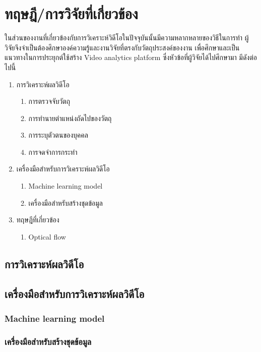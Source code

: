 \clearpage
\chapter{ทฤษฎี/การวิจัยที่เกี่ยวข้อง}
ในส่วนของงานที่เกี่ยวข้องกับการวิเคราะห์วิดีโอในปัจจุบันนั้นมีความหลากหลายของวิธีในการทำ ผู้วิจัยจึงจำเป็นต้องศึกษาองค์ความรู้และงานวิจัยที่ตรงกับวัตถุประสงค์ของงาน เพื่อศึกษาและเป็นแนวทางในการประยุกต์ใช้สร้าง Video analytics platform ซึ่งหัวข้อที่ผู้วิจัยได้ไปศึกษามา มีดังต่อไปนี้
\begin{enumerate}
	\setlength\itemsep{-0.25em}
	\item การวิเคราะห์ผลวิดีโอ
	\begin{enumerate}	
		\item การตรวจจับวัตถุ
		\item การทำนายตำแหน่งถัดไปของวัตถุ
		\item การระบุตัวตนของบุคคล
		\item การจดจำการกระทำ
	\end{enumerate}
	\setlength\itemsep{-0.25em}
	\item เครื่องมือสำหรับการวิเคราะห์ผลวิดีโอ
	\begin{enumerate}	
		\item Machine learning model
		\item เครื่องมือสำหรับสร้างชุดข้อมูล
	\end{enumerate}
	\item ทฤษฎีที่เกี่ยวข้อง
	\begin{enumerate}	
		\item Optical flow
	\end{enumerate}
\end{enumerate}

\section{การวิเคราะห์ผลวิดีโอ}


\clearpage
\section{เครื่องมือสำหรับการวิเคราะห์ผลวิดีโอ}
\subsection{Machine learning model}
\subsection{เครื่องมือสำหรับสร้างชุดข้อมูล}


